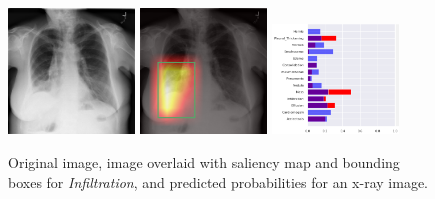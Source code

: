 \documentclass[8pt]{beamer}
\begin{document}
\begin{frame}
\begin{figure}[H]
  \centering
  \includegraphics[width=0.3\textwidth]{images/preds/infiltration}\hspace{0.01\textwidth}%
  \includegraphics[width=0.3\textwidth]{images/preds/infiltration_cam}\hspace{0.01\textwidth}%
  \includegraphics[width=0.3\textwidth]{images/preds/infiltration_probs}\\[0.01\textwidth]
  \caption{Original image, image overlaid with saliency map and bounding boxes
    for \emph{Infiltration}, and predicted probabilities for an x-ray image.}
  \label{examples_4}
\end{figure}
\end{frame}
\end{document}
